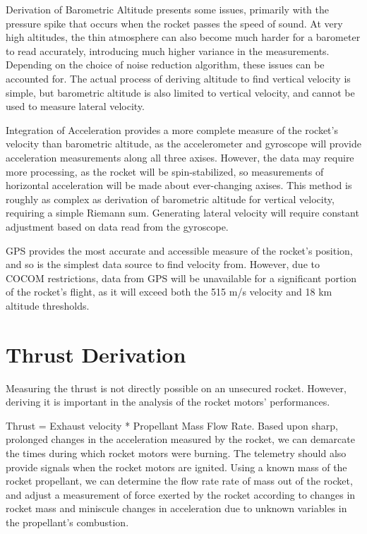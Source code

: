 \documentclass[onecolumn, draftclsnofoot,10pt, compsoc]{IEEEtran}
\begin{document}
		
		\noindent
		Derivation of Barometric Altitude presents some issues, primarily with the pressure spike that occurs when the rocket passes the speed of sound.
		At very high altitudes, the thin atmosphere can also become much harder for a barometer to read accurately, introducing much higher variance in the measurements.
		Depending on the choice of noise reduction algorithm, these issues can be accounted for.
		The actual process of deriving altitude to find vertical velocity is simple, but barometric altitude is also limited to vertical velocity, and cannot be used to measure lateral velocity.
		
		\noindent
		Integration of Acceleration provides a more complete measure of the rocket's velocity than barometric altitude, as the accelerometer and gyroscope will provide acceleration measurements along all three axises.
		However, the data may require more processing, as the rocket will be spin-stabilized, so measurements of horizontal acceleration will be made about ever-changing axises.
		This method is roughly as complex as derivation of barometric altitude for vertical velocity, requiring a simple Riemann sum.
		Generating lateral velocity will require constant adjustment based on data read from the gyroscope.
			
		\noindent
		GPS provides the most accurate and accessible measure of the rocket's position, and so is the simplest data source to find velocity from.
		However, due to COCOM restrictions, data from GPS will be unavailable for a significant portion of the rocket's flight, as it will exceed both the 515 m/s velocity and 18 km altitude thresholds\cite{COCOM}.
		
	\section{Thrust Derivation}
		\noindent
		Measuring the thrust is not directly possible on an unsecured rocket. 
		However, deriving it is important in the analysis of the rocket motors' performances.
		
		\noindent
		Thrust = Exhaust velocity * Propellant Mass Flow Rate.
		Based upon sharp, prolonged changes in the acceleration measured by the rocket, we can demarcate the times during which rocket motors were burning.
		The telemetry should also provide signals when the rocket motors are ignited.
		Using a known mass of the rocket propellant, we can determine the flow rate rate of mass out of the rocket, and adjust a measurement of force exerted by the rocket according to changes in rocket mass and miniscule changes in acceleration due to unknown variables in the propellant's combustion.
		
	\newpage
	
	
	
\end{document}
